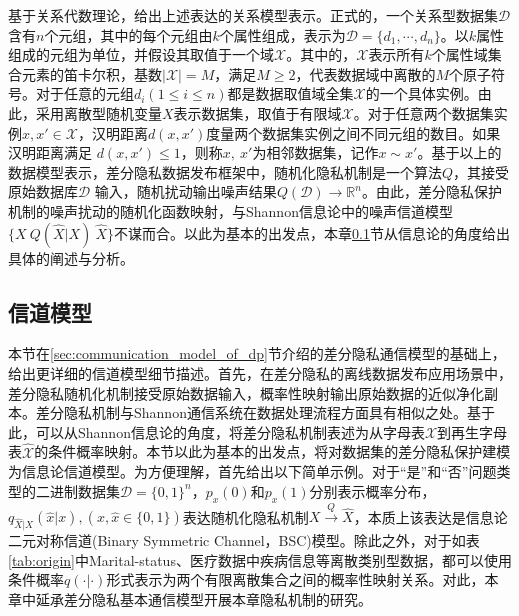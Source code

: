 基于关系代数理论，给出上述表达的关系模型表示。正式的，一个关系型数据集$\mathcal{D}$含有$n$个元组，其中的每个元组由$k$个属性组成，表示为$\mathcal{D}=\{d_1,\cdots,d_n\}$。以$k$属性组成的元组为单位，并假设其取值于一个域$\mathcal{X}$。其中的，$\mathcal{X}$表示所有$k$个属性域集合元素的笛卡尔积，基数$|\mathcal{X}|=M$，满足$M \geq 2$，代表数据域中离散的$M$个原子符号。对于任意的元组$d_i(1\leq i \leq n)$都是数据取值域全集$\mathcal{X}$的一个具体实例。由此，采用离散型随机变量$X$表示数据集，取值于有限域$\mathcal{X}$。对于任意两个数据集实例$x,x' \in \mathcal{X}$，汉明距离$d(x,x')$度量两个数据集实例之间不同元组的数目。如果汉明距离满足 $d(x,x')\leq 1$，则称$x,~x'$为相邻数据集，记作$x\sim x'$。基于以上的数据模型表示，差分隐私数据发布框架中，随机化隐私机制是一个算法$Q$，其接受原始数据库$\mathcal{D}$
输入，随机扰动输出噪声结果$Q(\mathcal{D})\rightarrow \mathbb{R}^{n}$\cite{dwork2014algorithmic}。由此，差分隐私保护机制的噪声扰动的随机化函数映射，与Shannon信息论中的噪声信道模型$\{X~Q(\hat{X}|X)~\hat{X}\}$\cite{xiong2016randomized,alvim2011differential}不谋而合。以此为基本的出发点，本章\ref{chapter05-achieve-channel}节从信息论的角度给出具体的阐述与分析。

\subsection{信道模型}\label{chapter05-achieve-channel}

本节在\ref{sec:communication_model_of_dp}节介绍的差分隐私通信模型的基础上，给出更详细的信道模型细节描述。首先，在差分隐私的离线数据发布应用场景中，差分隐私随机化机制接受原始数据输入，概率性映射输出原始数据的近似净化副本。差分隐私机制与Shannon通信系统在数据处理流程方面具有相似之处。基于此，可以从Shannon信息论的角度，将差分隐私机制表述为从字母表$\mathcal{X}$到再生字母表$\mathcal{\hat{X}}$的条件概率映射。本节以此为基本的出发点，将对数据集的差分隐私保护建模为信息论信道模型。为方便理解，首先给出以下简单示例。对于``是''和``否''问题类型的二进制数据集$\mathcal{D}=\{0,1\}^{n}$，$p_x(0)$和$p_x(1)$分别表示概率分布，$q_{\hat{X}|X}(\hat{x}|x),(x,\hat{x}\in \{0,1\})$表达随机化隐私机制$X\xrightarrow{Q} \hat{X}$，本质上该表达是信息论二元对称信道(Binary Symmetric Channel，BSC)模型。除此之外，对于如表\ref{tab:origin}中Marital-status、医疗数据中疾病信息等离散类别型数据，都可以使用条件概率$q(\cdot|\cdot)$形式表示为两个有限离散集合之间的概率性映射关系。对此，本章中延承差分隐私基本通信模型开展本章隐私机制的研究。

